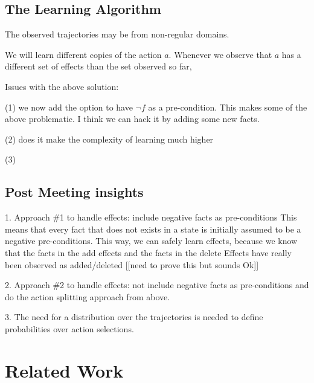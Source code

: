 \documentclass[letterpaper]{article}
\begin{document}
\subsection{The Learning Algorithm}
The observed trajectories may be from non-regular domains. 

We will learn different copies of the action $a$. 
Whenever we observe that $a$ has a different set of effects
than the set observed so far, 


Issues with the above solution: 

(1) we now add the option to have $\neg f$ as a pre-condition. This makes some of the above problematic. I think we can hack it by adding some new facts. 

(2) does it make the complexity of learning much higher

(3) 

\subsection{Post Meeting insights}

1. Approach \#1 to handle effects: include negative facts as pre-conditions
This means that every fact that does not exists in a state 
is initially assumed to be a negative pre-conditions. 
This way, we can safely learn effects, because we know that 
the facts in the add effects and the facts in the delete Effects
have  really been observed as added/deleted [[need to prove this but sounds Ok]]

2. Approach \#2 to handle effects: not include negative facts as pre-conditions
and do the action splitting approach from above. 


3. The need for a distribution over the trajectories is needed
to define probabilities over action selections. 


\section{Related Work}
\end{document}
